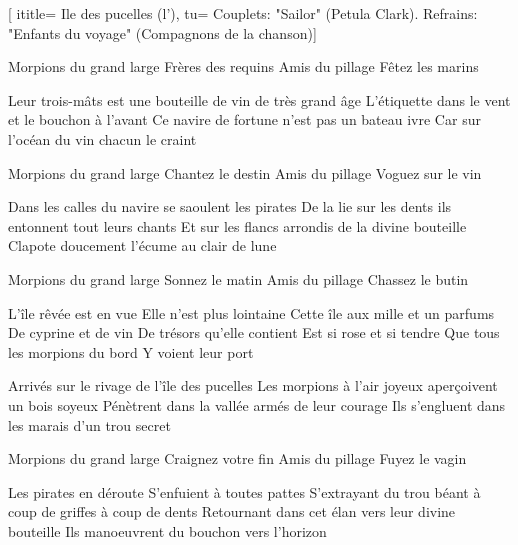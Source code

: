 [
ititle= {Ile des pucelles (l')},
tu= {Couplets: "Sailor" (Petula Clark). Refrains: "Enfants du voyage" (Compagnons de la chanson)}]


\beginchorus
Morpions du grand large
Frères des requins
Amis du pillage
Fêtez les marins
\endchorus

\beginverse
Leur trois-mâts est une bouteille
de vin de très grand âge
L'étiquette dans le vent
et le bouchon à l'avant
Ce navire de fortune
n'est pas un bateau ivre
Car sur l'océan du vin
chacun le craint
\endverse

\beginchorus
Morpions du grand large
Chantez le destin
Amis du pillage
Voguez sur le vin
\endchorus

\beginverse
Dans les calles du navire
se saoulent les pirates
De la lie sur les dents
ils entonnent tout leurs chants
Et sur les flancs arrondis
de la divine bouteille
Clapote doucement l'écume
au clair de lune
\endverse

\beginchorus
Morpions du grand large
Sonnez le matin
Amis du pillage
Chassez le butin
\endchorus

\beginverse
L'île rêvée est en vue
Elle n'est plus lointaine
Cette île aux mille et un parfums
De cyprine et de vin
De trésors qu'elle contient
Est si rose et si tendre
Que tous les morpions du bord
Y voient leur port
\endverse

\beginverse
Arrivés sur le rivage
de l'île des pucelles
Les morpions à l'air joyeux
aperçoivent un bois soyeux
Pénètrent dans la vallée
armés de leur courage
Ils s'engluent dans les marais
d'un trou secret
\endverse

\beginchorus
Morpions du grand large
Craignez votre fin
Amis du pillage
Fuyez le vagin
\endchorus

\beginverse
Les pirates en déroute
S'enfuient à toutes pattes
S'extrayant du trou béant
à coup de griffes à coup de dents
Retournant dans cet élan
vers leur divine bouteille
Ils manoeuvrent du bouchon
vers l'horizon
\endverse

\endsong